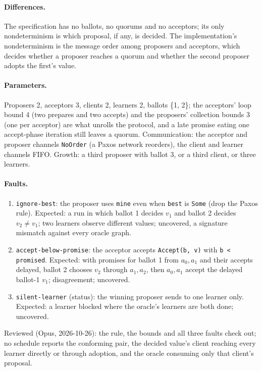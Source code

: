 \documentclass[11pt,a4paper]{article}
\newcommand{\code}[1]{\texttt{#1}}
\begin{document}
\paragraph{Differences.} The specification has no ballots, no quorums and no acceptors; its
only nondeterminism is which proposal, if any, is decided. The implementation's nondeterminism is
the message order among proposers and acceptors, which decides whether a proposer reaches a
quorum and whether the second proposer adopts the first's value.

\paragraph{Parameters.} Proposers 2, acceptors 3, clients 2, learners 2, ballots \{1, 2\}; the
acceptors' loop bound 4 (two prepares and two accepts) and the proposers' collection bounds 3
(one per acceptor) are what unrolls the protocol, and a late promise eating one accept-phase
iteration still leaves a quorum. Communication: the acceptor and proposer channels \code{NoOrder}
(a Paxos network reorders), the client and learner channels FIFO. Growth: a third proposer with ballot 3, or a third client, or three
learners.

\paragraph{Faults.}
\begin{enumerate}
  \item \code{ignore-best}: the proposer uses \code{mine} even when \code{best} is \code{Some}
        (drop the Paxos rule). Expected: a run in which ballot 1 decides $v_1$ and ballot 2
        decides $v_2 \neq v_1$; two learners observe different values; uncovered, a signature
        mismatch against every oracle graph.
  \item \code{accept-below-promise}: the acceptor accepts \code{Accept(b, v)} with
        \code{b < promised}. Expected: with promises for ballot 1 from $a_0, a_1$ and their
        accepts delayed, ballot 2 chooses $v_2$ through $a_1, a_2$, then $a_0, a_1$ accept the
        delayed ballot-1 $v_1$; disagreement; uncovered.
  \item \code{silent-learner} (status): the winning proposer sends to one learner only.
        Expected: a learner blocked where the oracle's learners are both done; uncovered.
\end{enumerate}

Reviewed (Opus, 2026-10-26): the rule, the bounds and all three faults check out; no schedule
reports the conforming pair, the decided value's client reaching every learner directly or
through adoption, and the oracle consuming only that client's proposal.
\end{document}
